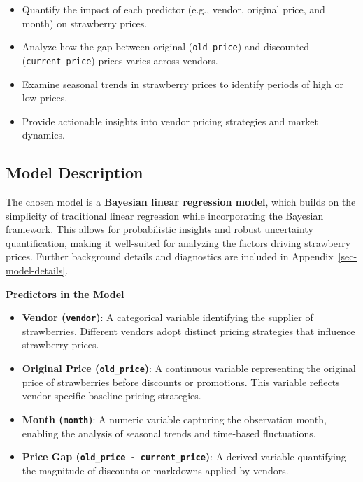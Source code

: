 \documentclass[
  letterpaper,
  DIV=11,
  numbers=noendperiod]{scrartcl}
\providecommand{\tightlist}{%
  \setlength{\itemsep}{0pt}\setlength{\parskip}{0pt}}\usepackage{longtable,booktabs,array}
\begin{document}
\begin{itemize}
\tightlist
\item
  Quantify the impact of each predictor (e.g., vendor, original price,
  and month) on strawberry prices.
\item
  Analyze how the gap between original (\texttt{old\_price}) and
  discounted (\texttt{current\_price}) prices varies across vendors.
\item
  Examine seasonal trends in strawberry prices to identify periods of
  high or low prices.
\item
  Provide actionable insights into vendor pricing strategies and market
  dynamics.
\end{itemize}

\subsection{Model Description}\label{model-description}

The chosen model is a \textbf{Bayesian linear regression model}, which
builds on the simplicity of traditional linear regression while
incorporating the Bayesian framework. This allows for probabilistic
insights and robust uncertainty quantification, making it well-suited
for analyzing the factors driving strawberry prices. Further background
details and diagnostics are included in
Appendix~\ref{sec-model-details}.

\textbf{Predictors in the Model}

\begin{itemize}
\item
  \textbf{Vendor (\texttt{vendor})}: A categorical variable identifying
  the supplier of strawberries. Different vendors adopt distinct pricing
  strategies that influence strawberry prices.
\item
  \textbf{Original Price (\texttt{old\_price})}: A continuous variable
  representing the original price of strawberries before discounts or
  promotions. This variable reflects vendor-specific baseline pricing
  strategies.
\item
  \textbf{Month (\texttt{month})}: A numeric variable capturing the
  observation month, enabling the analysis of seasonal trends and
  time-based fluctuations.
\item
  \textbf{Price Gap (\texttt{old\_price\ -\ current\_price})}: A derived
  variable quantifying the magnitude of discounts or markdowns applied
  by vendors.
\end{itemize}
\end{document}
